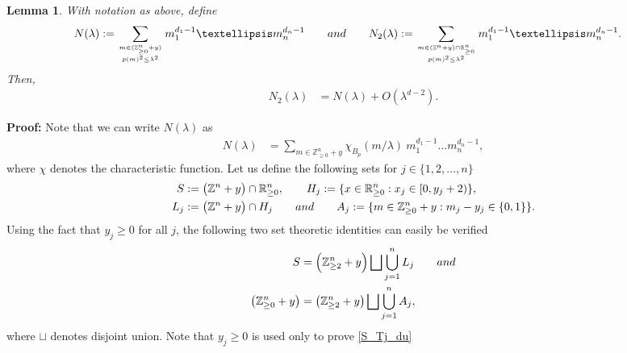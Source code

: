 \documentclass[11pt,lettersize,reqno,fullpage]{amsart}
\newtheorem{lmm}[thm]{Lemma}
\begin{document}
\begin{lmm}
\label{Int_Lmm} 
With notation as above, define 
\begin{align*}
N(\lambda) &:= \sum_{{m \in (\mathbb{Z}_{\geq 0}^{n} + y)}
\atop{p(m)^2 \leq \lambda^2}}m_1^{d_1-1} \ldots m_n^{d_n-1} 
\qquad \textnormal{and} \qquad 
N_2(\lambda) := \sum_{{m \in (\mathbb{Z}^n + y) 
\cap \mathbb{R}_{\geq 0}^{n}}\atop{p(m)^2 \leq \lambda^2}}m_1^{d_1-1}\ldots m_n^{d_n-1}.
\end{align*} 
Then, 
\begin{align}
N_2(\lambda)&= N(\lambda) + O(\lambda^{d-2}). \label{N2_eq_N_plus_O_lm_d_minus_2}
\end{align}
\end{lmm}
\noindent\textbf{Proof:} %
Note that we can write $N(\lambda)$ as 
\begin{align*}
N(\lambda) & = \sum_{m \in \mathbb{Z}^{n}_{\geq 0} + y} \chi_{B_p} (m/\lambda)\ m_1^{d_1-1} \ldots m_n^{d_n-1}, 
\end{align*}
where $\chi$ denotes the characteristic function. 
Let us define the following sets for $j \in \{1, 2, \ldots, n\}$
\begin{align*} 
S&:= \big(\mathbb{Z}^n+y\big)\cap \mathbb{R}_{\geq 0}^n, \qquad
H_j:= \{x \in \mathbb{R}^n_{\geq 0} : x_j \in [0, y_j + 2)\}, \\ 
L_j&:= \big(\mathbb{Z}^n+y\big)\cap H_j  
\qquad \textnormal{and} \qquad A_j:= \{m \in \mathbb{Z}_{\geq 0}^n+y : m_j-y_j \in \{0, 1\}\}.
\end{align*}
Using the fact that $y_j \geq 0$ for all $j$, 
the following two set theoretic identities can easily be verified 
\begin{align} 
S&= \Big(\mathbb{Z}^{n}_{\geq 2} + y\Big) \bigsqcup \bigcup_{j=1}^{n} L_j 
\qquad \textnormal{and} \label{S_Tj_du} \\ 
\big(\mathbb{Z}_{\geq 0}^n+y\big) & = \big(\mathbb{Z}_{\geq 2}^n+y\big) \bigsqcup \bigcup_{j=1}^{n}A_j, 
\label{Aj_du} 
\end{align} 
where $\sqcup$ denotes disjoint union. Note that 
$y_j \geq 0$ is used only to prove \eqref{S_Tj_du} 
\end{document}
